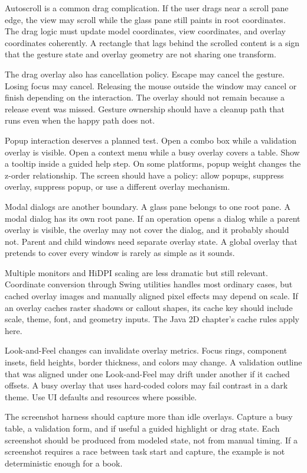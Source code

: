 Autoscroll is a common drag complication. If the user drags near a scroll pane edge, the view may scroll while the glass pane still paints in root coordinates. The drag logic must update model coordinates, view coordinates, and overlay coordinates coherently. A rectangle that lags behind the scrolled content is a sign that the gesture state and overlay geometry are not sharing one transform.

The drag overlay also has cancellation policy. Escape may cancel the gesture. Losing focus may cancel. Releasing the mouse outside the window may cancel or finish depending on the interaction. The overlay should not remain because a release event was missed. Gesture ownership should have a cleanup path that runs even when the happy path does not.

Popup interaction deserves a planned test. Open a combo box while a validation overlay is visible. Open a context menu while a busy overlay covers a table. Show a tooltip inside a guided help step. On some platforms, popup weight changes the z-order relationship. The screen should have a policy: allow popups, suppress overlay, suppress popup, or use a different overlay mechanism.

Modal dialogs are another boundary. A glass pane belongs to one root pane. A modal dialog has its own root pane. If an operation opens a dialog while a parent overlay is visible, the overlay may not cover the dialog, and it probably should not. Parent and child windows need separate overlay state. A global overlay that pretends to cover every window is rarely as simple as it sounds.

Multiple monitors and HiDPI scaling are less dramatic but still relevant. Coordinate conversion through Swing utilities handles most ordinary cases, but cached overlay images and manually aligned pixel effects may depend on scale. If an overlay caches raster shadows or callout shapes, its cache key should include scale, theme, font, and geometry inputs. The Java 2D chapter's cache rules apply here.

Look-and-Feel changes can invalidate overlay metrics. Focus rings, component insets, field heights, border thickness, and colors may change. A validation outline that was aligned under one Look-and-Feel may drift under another if it cached offsets. A busy overlay that uses hard-coded colors may fail contrast in a dark theme. Use UI defaults and resources where possible.

The screenshot harness should capture more than idle overlays. Capture a busy table, a validation form, and if useful a guided highlight or drag state. Each screenshot should be produced from modeled state, not from manual timing. If a screenshot requires a race between task start and capture, the example is not deterministic enough for a book.

